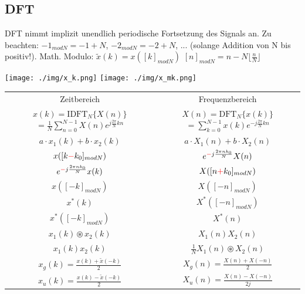 \documentclass[10pt,a4paper]{article}
\begin{document}
\subsection{DFT}
DFT nimmt implizit unendlich periodische Fortsetzung des Signals an. Zu beachten: $-1_{modN}=-1 + N$, $-2_{modN}=-2+N$, ... (solange Addition von N bis positiv!).
Math. Modulo:
$\tilde{x}(k) = x([k]_{modN})$ 
$[n]_{modN}=n-N \lfloor \frac{n}{N} \rfloor$
  \begin{center}
      \texttt{[image: ./img/x\_k.png]}
      \texttt{[image: ./img/x\_mk.png]}
  \end{center}

\begin{center}
  \bgroup
  \def\arraystretch{1.5}
  \begin{tabular}{ | c | c | }
  \cline{1-2}
          \rowcolor{black!15}
          Zeitbereich & Frequenzbereich \\
  
  \cline{1-2}
          \shortstack{$x(k)=\text{IDFT}_N\{X(n)\}$ \\ $=\frac{1}{N}\displaystyle\sum\limits_{n=0}^{N-1}X(n)e^{j\frac{2\pi}{N}kn}$} &
          \shortstack{$X(n)=\text{DFT}_N\{x(k)\}$ \\ $=\displaystyle\sum\limits_{k=0}^{N-1}x(k)e^{-j\frac{2\pi}{N}kn}$} \\

  \cline{1-2}
          $a\cdot x_1(k)+ b\cdot x_2(k)$ & $a\cdot X_1(n) +b\cdot X_2(n)$ \\
  \cline{1-2}
          $x([k\textcolor{red}{-}k_0]_{modN})$ & $e^{\textcolor{red}{-}j\frac{2\pi nk_0}{N}} X(n)$\\
  \cline{1-2}
          $e^{\textcolor{red}{-}j\frac{2\pi nk_0}{N}} x(k)$ & $X([n\textcolor{red}{+}k_0]_{modN})$ \\  
  \cline{1-2}
          $x([-k]_{modN})$ & $X([-n]_{modN})$ \\  
  \cline{1-2}
          $x^*(k)$& $X^*([-n]_{modN})$\\ 
  \cline{1-2}
          $x^*([-k]_{modN})$& $X^*(n)$\\ 
  \cline{1-2}
          $x_1(k) \circledast x_2(k)$ & $X_1(n)X_2(n)$ \\  
  \cline{1-2}
          $x_1(k)x_2(k)$ & $\frac{1}{N} X_1(n) \circledast X_2(n)$ \\
  \cline{1-2}
          $x_g(k)=\frac{x(k)+\tilde{x}(-k)}{2}$ & $X_g(n)=\frac{X(n)+X(-n)}{2}$ \\
  \cline{1-2}
          $x_u(k)=\frac{x(k)-\tilde{x}(-k)}{2}$ & $X_u(n)=\frac{X(n)-X(-n)}{2j}$ \\
  \cline{1-2}
  \end{tabular}
  \egroup
\end{center}
\end{document}
